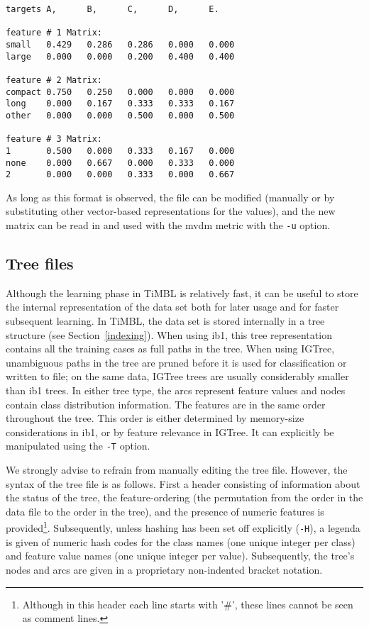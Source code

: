\documentclass{book}
\begin{document}
\begin{footnotesize}
\begin{verbatim}
targets A,      B,      C,      D,      E.

feature # 1 Matrix: 
small   0.429   0.286   0.286   0.000   0.000
large   0.000   0.000   0.200   0.400   0.400
 
feature # 2 Matrix: 
compact 0.750   0.250   0.000   0.000   0.000
long    0.000   0.167   0.333   0.333   0.167
other   0.000   0.000   0.500   0.000   0.500
 
feature # 3 Matrix: 
1       0.500   0.000   0.333   0.167   0.000
none    0.000   0.667   0.000   0.333   0.000
2       0.000   0.000   0.333   0.000   0.667
\end{verbatim}
\end{footnotesize}

As long as this format is observed, the file can be modified (manually
or by substituting other vector-based representations for the
values), and the new matrix can be read in and used with the {\sc
mvdm} metric with the {\tt -u} option.

\subsection{Tree files}
\label{treeformat}

Although the learning phase in TiMBL is relatively fast, it can be
useful to store the internal representation of the data set both for
later usage and for faster subsequent learning. In TiMBL, the data set
is stored internally in a tree structure (see
Section~\ref{indexing}). When using {\sc ib1}, this tree
representation contains all the training cases as full paths in the
tree. When using {\sc IGTree}, unambiguous paths in the tree are
pruned before it is used for classification or written to file; on the
same data, {\sc IGTree} trees are usually considerably smaller than
{\sc ib1} trees. In either tree type, the arcs represent feature
values and nodes contain class distribution information. The features
are in the same order throughout the tree. This order is either
determined by memory-size considerations in {\sc ib1}, or by feature
relevance in {\sc IGTree}. It can explicitly be manipulated using the
{\tt -T} option.

We strongly advise to refrain from manually editing the tree
file. However, the syntax of the tree file is as follows. First a
header consisting of information about the status of the tree, the
feature-ordering (the permutation from the order in the data file to
the order in the tree), and the presence of numeric features is
provided\footnote{Although in this header each line starts with '\#',
  these lines cannot be seen as comment lines.}. Subsequently, unless
hashing has been set off explicitly ({\tt -H}), a legenda is given of
numeric hash codes for the class names (one unique integer per class)
and feature value names (one unique integer per value).  Subsequently,
the tree's nodes and arcs are given in a proprietary non-indented
bracket notation.
\end{document}
